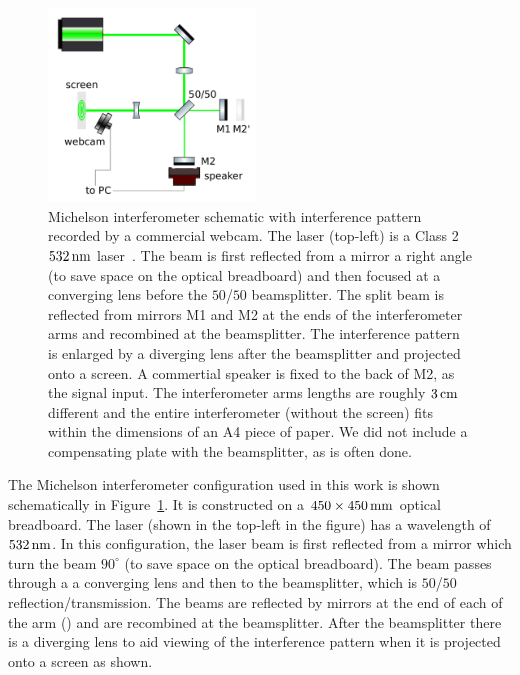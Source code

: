 \documentclass[paper-main.tex]{subfiles}
\begin{document}
\begin{figure}
	\includegraphics[width=0.49\textwidth]{figures/ifo_schematic_webcam.pdf}
	\caption{Michelson interferometer schematic with interference pattern recorded by a commercial webcam. The laser (top-left) is a Class 2 $532\,{\rm nm}$ laser~\cite{ThorLabsIFO}. The beam is first reflected from a mirror a right angle (to save space on the optical breadboard) and then focused at a converging lens before the $50$/$50$ beamsplitter. The split beam is reflected from mirrors M1 and M2 at the ends of the interferometer arms and recombined at the beamsplitter. The interference pattern is enlarged by a diverging lens after the beamsplitter and projected onto a screen. A commertial speaker is fixed to the back of M2, as the signal input. The interferometer arms lengths are roughly $3\,{\rm cm}$ different and the entire interferometer (without the screen) fits within the dimensions of an A4 piece of paper. We did not include a compensating plate with the beamsplitter, as is often done.} 
	\label{fig:ifo_schematic_webcam}
\end{figure}

The Michelson interferometer configuration used in this work is shown schematically in Figure~\ref{fig:ifo_schematic_webcam}.
It is constructed on a $450 \times 450 \,{\rm mm} $ optical breadboard. 
The laser (shown in the top-left in the figure) has a wavelength of $532\,{\rm nm}$.
In this configuration, the laser beam is first reflected from a mirror which turn the beam $90^{\circ}$ (to save space on the optical breadboard). 
The beam passes through a a converging lens and then to the beamsplitter, which is $50$/$50$ reflection/transmission. 
The beams are reflected by mirrors at the end of each of the arm () and are recombined at the beamsplitter. 
After the beamsplitter there is a diverging lens to aid viewing of the interference pattern when it is projected onto a screen as shown.
\end{document}
